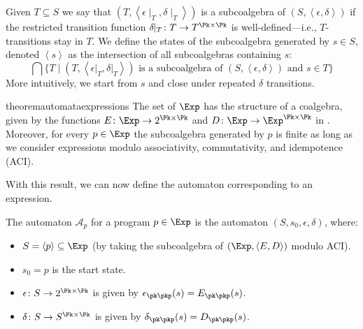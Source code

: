 Given $T\subseteq S$ we say that
$(T,\left<\epsilon\!\!\mid_T,\delta\!\!\mid_T\right>)$ is a
subcoalgebra of $(S,\left<\epsilon,\delta\right>)$ if the restricted
transition function $\delta\!\!\mid_T \colon T \to T^{\Pk\times\Pk}$
is well-defined---i.e., $T$-transitions stay in $T$. We define the
states of the subcoalgebra generated by $s\in S$, denoted
$\left<s\right>$ as the intersection of all subcoalgebras containing
$s$:
\[
\bigcap \{ T \mid (T,\left<\epsilon\vert_T,\delta\vert_T\right>) \text{ is a subcoalgebra of } (S,\left<\epsilon,\delta\right>) \text{ and } s\in T \}
\]
More intuitively, we start from $s$ and close under repeated $\delta$ transitions.

\begin{restatable}{theorem}{automataexpressions}
The set of $\Exp$ has the structure of a \NetKAT coalgebra, given by
the functions $E\colon \Exp \to 2^{\Pk\times\Pk}$ and $D \colon\Exp
\to \Exp^{\Pk\times\Pk}$ in . Moreover, for
every $p\in\Exp$ the subcoalgebra generated by $p$ is finite as long
as we consider expressions modulo associativity, commutativity, and
idempotence (ACI).
\end{restatable}

With this result, we can now define the \NetKAT automaton
corresponding to an expression.

\begin{definition} The \NetKAT automaton $\mathcal A_p$ for a program $p\in\Exp$ is the automaton $(S, s_0, \epsilon, \delta)$, where:
\begin{itemize}
    \item $S = \left<p\right> \subseteq \Exp$ (by taking the subcoalgebra of $(\Exp, \left<E,D\right>)$ modulo ACI).
    \item $s_0 = p$ is the start state.
    \item $\epsilon\colon S \to 2^{\Pk \times\Pk}$ is given by $\epsilon_{\pk\pkp}(s)  = E_{\pk\pkp}(s)$.
        \item $\delta\colon S \to S^{\Pk\times\Pk}$ is given by $\delta_{\pk\pkp}(s) = D_{\pk\pkp}(s)$.
\end{itemize}
\end{definition}

